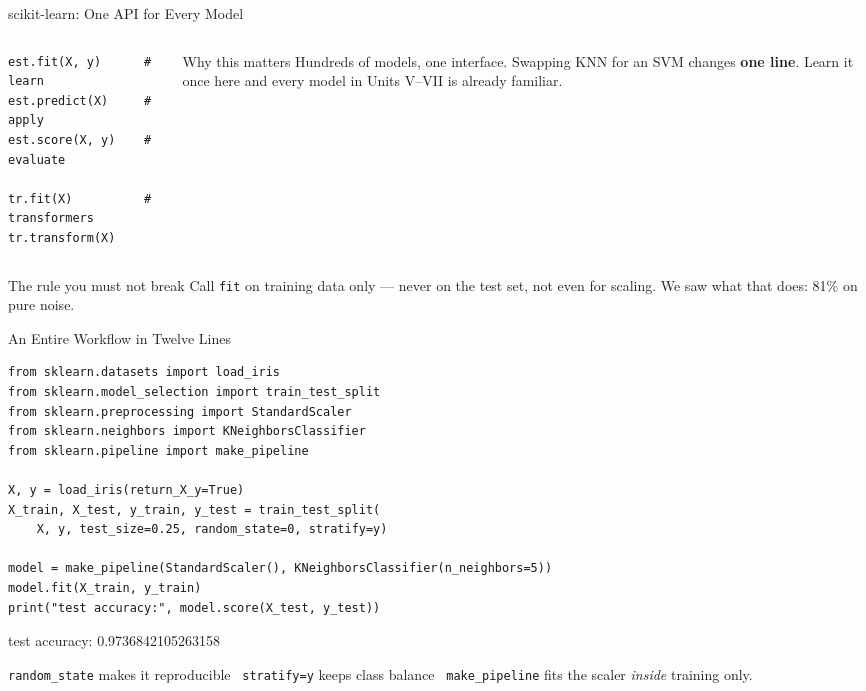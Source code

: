 \documentclass[aspectratio=169]{beamer}
\begin{document}
\begin{frame}[fragile,shrink=6]{scikit-learn: One API for Every Model}
  \begin{columns}[T]
    \begin{column}{0.46\textwidth}
      \begin{lstlisting}
est.fit(X, y)      # learn
est.predict(X)     # apply
est.score(X, y)    # evaluate

tr.fit(X)          # transformers
tr.transform(X)
      \end{lstlisting}
    \end{column}
    \begin{column}{0.52\textwidth}
      \begin{block}{Why this matters}
        Hundreds of models, one interface. Swapping KNN for an SVM changes
        \textbf{one line}. Learn it once here and every model in Units V--VII is
        already familiar.
      \end{block}
    \end{column}
  \end{columns}
  \vspace{0.2em}
  \begin{alertblock}{The rule you must not break}
    Call \texttt{fit} on training data only --- never on the test set, not even
    for scaling. We saw what that does: 81\% on pure noise.
  \end{alertblock}
\end{frame}

\begin{frame}[fragile,shrink=16]{An Entire Workflow in Twelve Lines}
  \begin{lstlisting}
from sklearn.datasets import load_iris
from sklearn.model_selection import train_test_split
from sklearn.preprocessing import StandardScaler
from sklearn.neighbors import KNeighborsClassifier
from sklearn.pipeline import make_pipeline

X, y = load_iris(return_X_y=True)
X_train, X_test, y_train, y_test = train_test_split(
    X, y, test_size=0.25, random_state=0, stratify=y)

model = make_pipeline(StandardScaler(), KNeighborsClassifier(n_neighbors=5))
model.fit(X_train, y_train)
print("test accuracy:", model.score(X_test, y_test))
  \end{lstlisting}
  \begin{outblk}
test accuracy: 0.9736842105263158
  \end{outblk}
  \vspace{0.1em}
  {\footnotesize
  \texttt{random\_state} makes it reproducible \textbullet\
  \texttt{stratify=y} keeps class balance \textbullet\
  \texttt{make\_pipeline} fits the scaler \emph{inside} training only.}
\end{frame}
\end{document}
